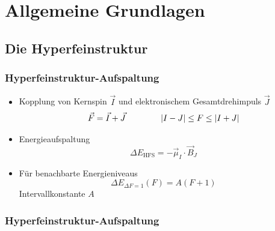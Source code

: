 
\section{Allgemeine Grundlagen}

\subsection{Die Hyperfeinstruktur}

\begin{frame}
\frametitle{Hyperfeinstruktur-Aufspaltung}
\begin{itemize}
    \item<1-> Kopplung von Kernspin $\vec{I}$ und elektronischem Gesamtdrehimpuls $\vec{J}$
    \begin{equation*}
        \vec{F} = \vec{I} + \vec{J} \qquad \qquad \left|I - J\right| \leq F \leq \left|I + J\right|
    \end{equation*}
    \item<2-> Energieaufspaltung
    \begin{equation*}
        \Delta E_\text{HFS} = - \vec{\mu}_I \cdot \vec{B}_J
    \end{equation*}
    \item<3-> Für benachbarte Energieniveaus
    \begin{equation*}
        \Delta E_{\Delta F = 1} (F) = A(F+1)
    \end{equation*}
    Intervallkonstante $A$
\end{itemize}
\end{frame}


\begin{frame}
\frametitle{Hyperfeinstruktur-Aufspaltung}

\begin{figure}
    \centering
    \def\svgwidth{0.45\textwidth}
    
    \label{img:termschema}
\end{figure}
\end{frame}

